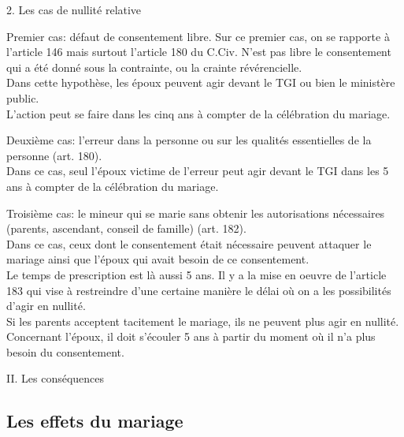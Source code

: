 \documentclass[12pt, a4paper, openany]{book}
\begin{document}
2. Les cas de nullité relative


Premier cas: défaut de consentement libre. Sur ce premier cas, on se rapporte à l'article 146 mais surtout l'article 180 du C.Civ. N'est pas libre le consentement qui a été donné sous la contrainte, ou la crainte révérencielle. \\
Dans cette hypothèse, les époux peuvent agir devant le TGI ou bien le ministère public. \\
L'action peut se faire dans les cinq ans à compter de la célébration du mariage. 


Deuxième cas: l'erreur dans la personne ou sur les qualités essentielles de la personne (art. 180). \\
Dans ce cas, seul l'époux victime de l'erreur peut agir devant le TGI dans les 5 ans à compter de la célébration du mariage. 


Troisième cas: le mineur qui se marie sans obtenir les autorisations nécessaires (parents, ascendant, conseil de famille) (art. 182). \\
Dans ce cas, ceux dont le consentement était nécessaire peuvent attaquer le mariage ainsi que l'époux qui avait besoin de ce consentement. \\
Le temps de prescription est là aussi 5 ans. Il y a la mise en oeuvre de l'article 183 qui vise à restreindre d'une certaine manière le délai où on a les possibilités d'agir en nullité. \\
Si les parents acceptent tacitement le mariage, ils ne peuvent plus agir en nullité. Concernant l'époux, il doit s'écouler 5 ans à partir du moment où il n'a plus besoin du consentement.



II. Les conséquences




\subsection{Les effets du mariage}
\end{document}
